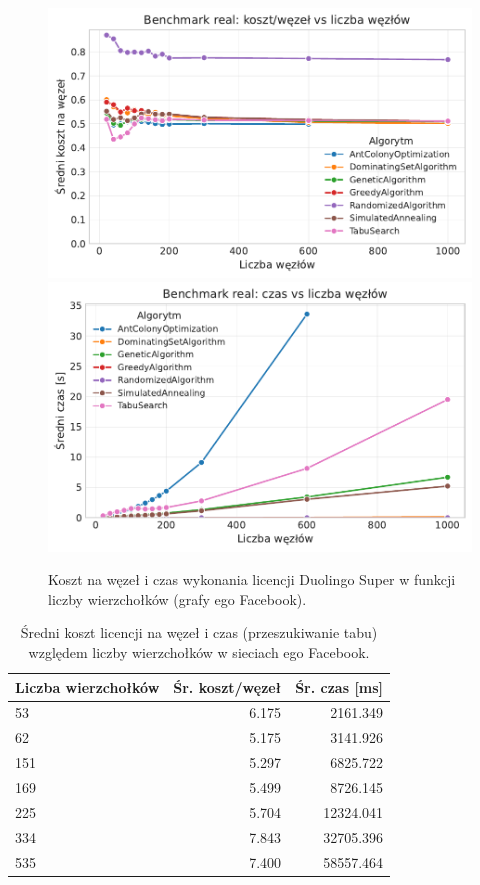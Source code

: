\begin{figure}[H]
  \centering
  \includegraphics[width=0.48\linewidth]{assets/figures/benchmark/real/cost_per_node_vs_nodes.pdf}
  \hfill
  \includegraphics[width=0.48\linewidth]{assets/figures/benchmark/real/time_vs_nodes.pdf}
  \caption{Koszt na węzeł i czas wykonania licencji Duolingo Super w funkcji liczby wierzchołków (grafy ego Facebook).}
  \label{fig:duo-real-size}
\end{figure}

\begin{table}[H]
  \centering
  \caption{Średni koszt licencji na węzeł i czas (przeszukiwanie tabu) względem liczby wierzchołków w sieciach ego Facebook.}
  \label{tab:duo-real-size-table}
  \begin{tabular}{lrr}
    \toprule
    \textbf{Liczba wierzchołków} & \textbf{Śr. koszt/węzeł} & \textbf{Śr. czas [ms]} \\
    \midrule
    53                           & 6.175                    & 2161.349               \\
    62                           & 5.175                    & 3141.926               \\
    151                          & 5.297                    & 6825.722               \\
    169                          & 5.499                    & 8726.145               \\
    225                          & 5.704                    & 12324.041              \\
    334                          & 7.843                    & 32705.396              \\
    535                          & 7.400                    & 58557.464              \\
    \bottomrule
  \end{tabular}
\end{table}


